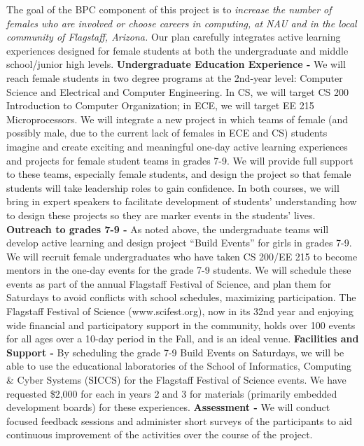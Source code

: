 The goal of the BPC component of this project is to \textit{increase the number of females who are involved or choose careers in computing, at NAU and in the local community of Flagstaff, Arizona.}  Our plan carefully integrates active learning experiences designed for female students at both the undergraduate and middle school/junior high levels.
\textbf{Undergraduate Education Experience -} We will reach female students in two degree programs at the 2nd-year level: Computer Science and Electrical and Computer Engineering. In CS, we will target CS 200 Introduction to Computer Organization; in ECE, we will target EE 215 Microprocessors. We will integrate a new project in which teams of female (and possibly male, due to the current lack of females in ECE and CS) students imagine and create exciting and meaningful one-day active learning experiences and projects for female student teams in grades 7-9.  We will provide full support to these teams, especially female students, and design the project so that female students will take leadership roles to gain confidence.  In both courses, we will bring in expert speakers to facilitate development of students’ understanding how to design these projects so they are marker events in the students’ lives. %
\textbf{Outreach to grades 7-9 -} As noted above, the undergraduate teams will develop active learning and design project “Build Events” for girls in grades 7-9. We will recruit female undergraduates who have taken CS 200/EE 215 to become mentors in the one-day events for the grade 7-9 students.  We will schedule these events as part of the annual Flagstaff Festival of Science, and plan them for Saturdays to avoid conflicts with school schedules, maximizing participation. The Flagstaff Festival of Science (www.scifest.org), now in its 32nd year and enjoying wide financial and participatory support in the community, holds over 100 events for all ages over a 10-day period in the Fall, and is an ideal venue.
\textbf{Facilities and Support -} By scheduling the grade 7-9 Build Events on Saturdays, we will be able to use the educational laboratories of the School of Informatics, Computing \& Cyber Systems (SICCS) for the Flagstaff Festival of Science events. We have requested \$2,000 for each in years 2 and 3 for materials (primarily embedded development boards) for these experiences.
\textbf{Assessment -} We will conduct focused feedback sessions and administer short surveys of the participants to aid continuous improvement of the activities over the course of the project.